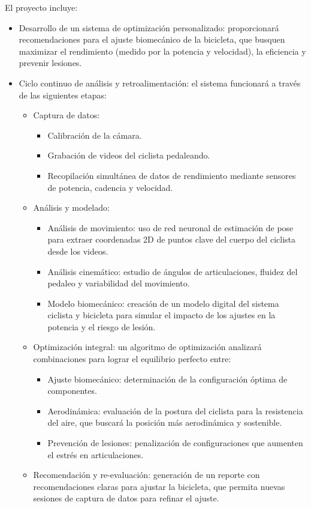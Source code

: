 \documentclass[
11pt, %
]{charter}
\begin{document}
El proyecto incluye:
\begin{itemize}
\item Desarrollo de un sistema de optimización personalizado: proporcionará recomendaciones para el ajuste biomecánico de la bicicleta, que busquen maximizar el rendimiento (medido por la potencia y velocidad), la eficiencia y prevenir lesiones.

\item Ciclo continuo de análisis y retroalimentación: el sistema funcionará a través de las siguientes etapas:
    \begin{itemize}
        \item Captura de datos:
            \begin{itemize}
             	\item Calibración de la cámara.
                \item Grabación de videos del ciclista pedaleando.
                \item Recopilación simultánea de datos de rendimiento mediante sensores de potencia, cadencia y velocidad.
            \end{itemize}
        \item Análisis y modelado:
            \begin{itemize}
                \item Análisis de movimiento: uso de red neuronal de estimación de pose para extraer coordenadas 2D de puntos clave del cuerpo del ciclista desde los videos.
                \item Análisis cinemático: estudio de ángulos de articulaciones, fluidez del pedaleo y variabilidad del movimiento.
                \item Modelo biomecánico: creación de un modelo digital del sistema ciclista y bicicleta para simular el impacto de los ajustes en la potencia y el riesgo de lesión.
            \end{itemize}
        \item Optimización integral: un algoritmo de optimización analizará combinaciones para lograr el equilibrio perfecto entre:
            \begin{itemize}
                \item Ajuste biomecánico: determinación de la configuración óptima de componentes.
                \item Aerodinámica: evaluación de la postura del ciclista para la resistencia del aire, que buscará la posición más aerodinámica y sostenible.
                \item Prevención de lesiones: penalización de configuraciones que aumenten el estrés en articulaciones.
            \end{itemize}
        \item Recomendación y re-evaluación: generación de un reporte con recomendaciones claras para ajustar la bicicleta, que permita nuevas sesiones de captura de datos para refinar el ajuste.
    \end{itemize}


\end{itemize}
\end{document}
